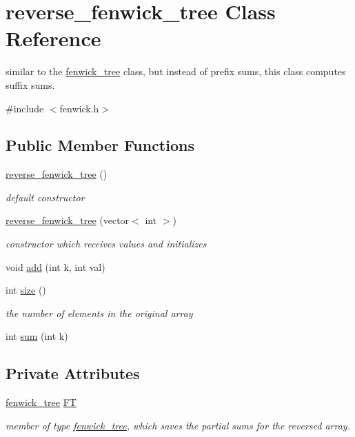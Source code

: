 \hypertarget{classreverse__fenwick__tree}{}\section{reverse\+\_\+fenwick\+\_\+tree Class Reference}
\label{classreverse__fenwick__tree}


similar to the \hyperlink{classfenwick__tree}{fenwick\+\_\+tree} class, but instead of prefix sums, this class computes suffix sums.  




{\ttfamily \#include $<$fenwick.\+h$>$}

\subsection*{Public Member Functions}
\begin{DoxyCompactItemize}
\item 
\hyperlink{classreverse__fenwick__tree_ab6cfb68e31b66f39f4b98db43c60f71e}{reverse\+\_\+fenwick\+\_\+tree} ()
\begin{DoxyCompactList}\small\item\em default constructor \end{DoxyCompactList}\item 
\hyperlink{classreverse__fenwick__tree_a508722d0bd06d2a591fc34e34b94c905}{reverse\+\_\+fenwick\+\_\+tree} (vector$<$ int $>$)
\begin{DoxyCompactList}\small\item\em constructor which receives values and initializes \end{DoxyCompactList}\item 
void \hyperlink{classreverse__fenwick__tree_a942d7f49b37e53ebfec3076d177691d7}{add} (int k, int val)
\item 
int \hyperlink{classreverse__fenwick__tree_ae15a8ac2ee6049baadcd110a98ae96e8}{size} ()
\begin{DoxyCompactList}\small\item\em the number of elements in the original array \end{DoxyCompactList}\item 
int \hyperlink{classreverse__fenwick__tree_a672731fd6395b4853430073a099a80e6}{sum} (int k)
\end{DoxyCompactItemize}
\subsection*{Private Attributes}
\begin{DoxyCompactItemize}
\item 
\hyperlink{classfenwick__tree}{fenwick\+\_\+tree} \hyperlink{classreverse__fenwick__tree_acde105967b3a3befc31e743807f7fd86}{FT}
\begin{DoxyCompactList}\small\item\em member of type \hyperlink{classfenwick__tree}{fenwick\+\_\+tree}, which saves the partial sums for the reversed array. \end{DoxyCompactList}\end{DoxyCompactItemize}


